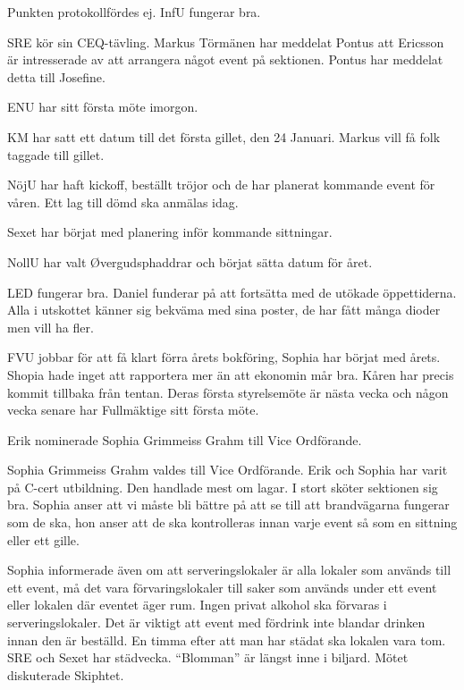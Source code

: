 \documentclass[10pt]{article}
\begin{document}
\begin{paragrafer}
\begin{paragrafer}
Punkten protokollfördes ej.
InfU fungerar bra.

SRE kör sin CEQ-tävling. Markus Törmänen har meddelat Pontus att Ericsson är intresserade av att arrangera något event på sektionen. Pontus har meddelat detta till Josefine.

ENU har sitt första möte imorgon.

KM har satt ett datum till det första gillet, den 24 Januari. Markus vill få folk taggade till gillet.

NöjU har haft kickoff, beställt tröjor och de har planerat kommande event för våren. Ett lag till dömd ska anmälas idag.

Sexet har börjat med planering inför kommande sittningar.

NollU har valt Øvergudsphaddrar och börjat sätta datum för året.

LED fungerar bra. Daniel funderar på att fortsätta med de utökade öppettiderna. Alla i utskottet känner sig bekväma med sina poster, de har fått många dioder men vill ha fler.

FVU jobbar för att få klart förra årets bokföring, Sophia har börjat med årets.
Shopia hade inget att rapportera mer än att ekonomin mår bra.
Kåren har precis kommit tillbaka från tentan. Deras första styrelsemöte är nästa vecka och någon vecka senare har Fullmäktige sitt första möte.
\end{paragrafer}

Erik nominerade Sophia Grimmeiss Grahm till Vice Ordförande.

Sophia Grimmeiss Grahm valdes till Vice Ordförande.
Erik och Sophia har varit på C-cert utbildning. Den handlade mest om lagar. I stort sköter sektionen sig bra. Sophia anser att vi måste bli bättre på att se till att brandvägarna fungerar som de ska, hon anser att de ska kontrolleras innan varje event så som en sittning eller ett gille.

Sophia informerade även om att serveringslokaler är alla lokaler som används till ett event, må det vara förvaringslokaler till saker som används under ett event eller lokalen där eventet äger rum. Ingen privat alkohol ska förvaras i serveringslokaler.
Det är viktigt att event med fördrink inte blandar drinken innan den är beställd. En timma efter att man har städat ska lokalen vara tom.
SRE och Sexet har städvecka.
``Blomman'' är längst inne i biljard.
Mötet diskuterade Skiphtet.


\end{paragrafer}
\end{document}
